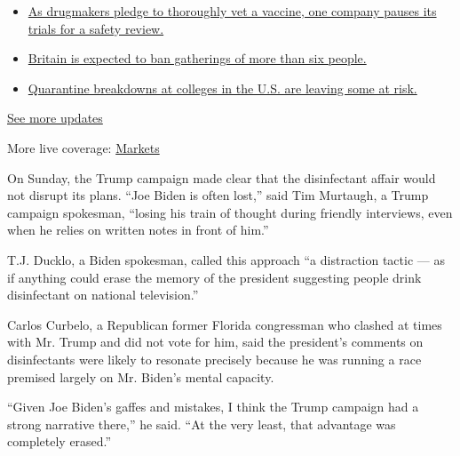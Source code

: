 \begin{itemize}
\tightlist
\item
  \href{https://www.nytimes3xbfgragh.onion/2020/09/09/world/covid-19-coronavirus.html?action=click\&pgtype=Article\&state=default\&region=MAIN_CONTENT_1\&context=storylines_live_updates\#link-70cea8bb}{As
  drugmakers pledge to thoroughly vet a vaccine, one company pauses its
  trials for a safety review.}
\item
  \href{https://www.nytimes3xbfgragh.onion/2020/09/09/world/covid-19-coronavirus.html?action=click\&pgtype=Article\&state=default\&region=MAIN_CONTENT_1\&context=storylines_live_updates\#link-780eaa2f}{Britain
  is expected to ban gatherings of more than six people.}
\item
  \href{https://www.nytimes3xbfgragh.onion/2020/09/09/world/covid-19-coronavirus.html?action=click\&pgtype=Article\&state=default\&region=MAIN_CONTENT_1\&context=storylines_live_updates\#link-11cec4c0}{Quarantine
  breakdowns at colleges in the U.S. are leaving some at risk.}
\end{itemize}

\href{https://www.nytimes3xbfgragh.onion/2020/09/09/world/covid-19-coronavirus.html?action=click\&pgtype=Article\&state=default\&region=MAIN_CONTENT_1\&context=storylines_live_updates}{See
more updates}

More live coverage:
\href{https://www.nytimes3xbfgragh.onion/live/2020/09/09/business/stock-market-today-coronavirus?action=click\&pgtype=Article\&state=default\&region=MAIN_CONTENT_1\&context=storylines_live_updates}{Markets}

On Sunday, the Trump campaign made clear that the disinfectant affair
would not disrupt its plans. ``Joe Biden is often lost,'' said Tim
Murtaugh, a Trump campaign spokesman, ``losing his train of thought
during friendly interviews, even when he relies on written notes in
front of him.''

T.J. Ducklo, a Biden spokesman, called this approach ``a distraction
tactic --- as if anything could erase the memory of the president
suggesting people drink disinfectant on national television.''

Carlos Curbelo, a Republican former Florida congressman who clashed at
times with Mr. Trump and did not vote for him, said the president's
comments on disinfectants were likely to resonate precisely because he
was running a race premised largely on Mr. Biden's mental capacity.

``Given Joe Biden's gaffes and mistakes, I think the Trump campaign had
a strong narrative there,'' he said. ``At the very least, that advantage
was completely erased.''

